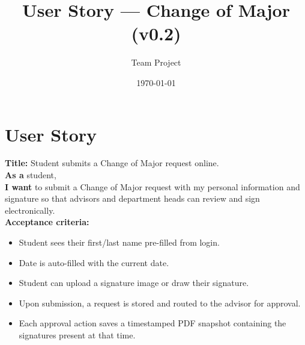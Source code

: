 \documentclass[11pt]{article}
\begin{document}
\title{User Story — Change of Major (v0.2)}
\author{Team Project}
\date{\today}
\maketitle

\section*{User Story}
\textbf{Title:} Student submits a Change of Major request online.\\
\textbf{As a} student,\\
\textbf{I want} to submit a Change of Major request with my personal information and signature so that advisors and department heads can review and sign electronically.\\
\textbf{Acceptance criteria:}
\begin{itemize}
  \item Student sees their first/last name pre-filled from login.
  \item Date is auto-filled with the current date.
  \item Student can upload a signature image or draw their signature.
  \item Upon submission, a request is stored and routed to the advisor for approval.
  \item Each approval action saves a timestamped PDF snapshot containing the signatures present at that time.
\end{itemize}
\end{document}
